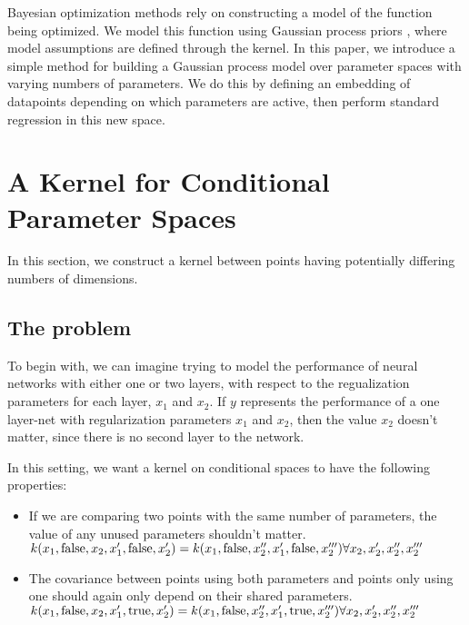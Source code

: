 \documentclass{article}
\begin{document}
Bayesian optimization methods rely on constructing a model of the function being optimized.  We model this function using Gaussian process priors \cite{rasmussen38gaussian}, where model assumptions are defined through the kernel.  In this paper, we introduce a simple method for building a Gaussian process model over parameter spaces with varying numbers of parameters.  We do this by defining an embedding of datapoints depending on which parameters are active, then perform standard regression in this new space.





\section{A Kernel for Conditional Parameter Spaces}

In this section, we construct a kernel between points having potentially differing numbers of dimensions.  

\subsection{The problem}
To begin with, we can imagine trying to model the performance of neural networks with either one or two layers, with respect to the regualization parameters for each layer, $x_1$ and $x_2$.  If $y$ represents the performance of a one layer-net with regularization parameters $x_1$ and $x_2$, then the value $x_2$ doesn't matter, since there is no second layer to the network.

In this setting, we want a kernel on conditional spaces to have the following properties:

\begin{itemize}
\item If we are comparing two points with the same number of parameters, the value of any unused parameters shouldn't matter.  
$k(x_1, \textnormal{false}, x_2, x_1', \textnormal{false}, x_2') 
= k(x_1, \textnormal{false}, x_2'', x_1', \textnormal{false}, x_2''')
\forall x_2, x_2', x_2'', x_2'''$
\item The covariance between points using both parameters and points only using one should again only depend on their shared parameters.
$k(x_1, \textnormal{false}, x_2, x_1', \textnormal{true}, x_2') 
= k(x_1, \textnormal{false}, x_2'', x_1', \textnormal{true}, x_2''')
\forall x_2, x_2', x_2'', x_2'''$
\end{itemize}
\end{document}

